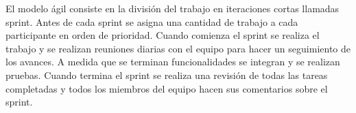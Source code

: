 El modelo ágil consiste en la división del trabajo en iteraciones cortas llamadas sprint. Antes de cada sprint se asigna una cantidad de trabajo a cada participante en orden de prioridad. Cuando comienza el sprint se realiza el trabajo y se realizan reuniones diarias con el equipo para hacer un seguimiento de los avances. A medida que se terminan funcionalidades se integran y se realizan pruebas. Cuando termina el sprint se realiza una revisión de todas las tareas completadas y todos los miembros del equipo hacen sus comentarios sobre el sprint.




